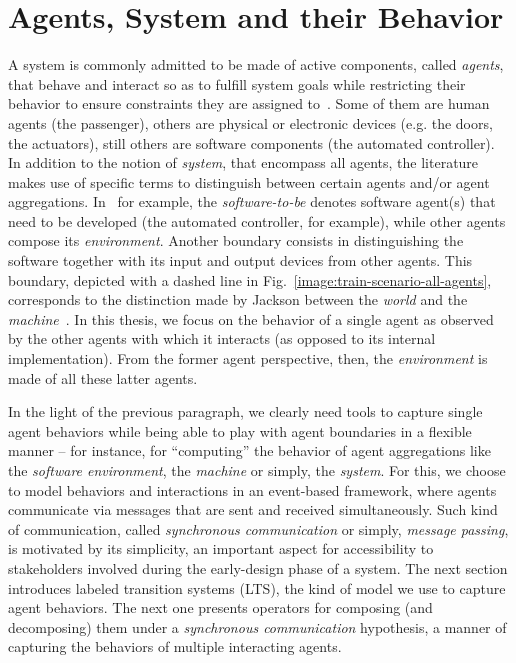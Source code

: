 \section{Agents, System and their Behavior}

A system is commonly admitted to be made of active components, called \emph{agents}, that behave and interact so as to fulfill system goals while restricting their behavior to ensure constraints they are assigned to~\cite{Feather:1987}. Some of them are human agents (the passenger), others are physical or electronic devices (e.g. the doors, the actuators), still others are software components (the automated controller). In addition to the notion of \emph{system}, that encompass all agents, the literature makes use of specific terms to distinguish between certain agents and/or agent aggregations. In~\cite{VanLamsweerde:2009} for example, the \emph{software-to-be} denotes software agent(s) that need to be developed (the automated controller, for example), while other agents compose its \emph{environment}. Another boundary consists in distinguishing the software together with its input and output devices from other agents. This boundary, depicted with a dashed line in Fig.~\ref{image:train-scenario-all-agents}, corresponds to the distinction made by Jackson between the \emph{world} and the \emph{machine}~\cite{Jackson:1995}. In this thesis, we focus on the behavior of a single agent as observed by the other agents with which it interacts (as opposed to its internal implementation). From the former agent perspective, then, the \emph{environment} is made of all these latter agents. 

In the light of the previous paragraph, we clearly need tools to capture single agent behaviors while being able to play with agent boundaries in a flexible manner -- for instance, for ``computing'' the behavior of agent aggregations like the \emph{software environment}, the \emph{machine} or simply, the \emph{system}. For this, we choose to model behaviors and interactions in an event-based framework, where agents communicate via messages that are sent and received simultaneously. Such kind of communication, called \emph{synchronous communication} or simply, \emph{message passing}, is motivated by its simplicity, an important aspect for accessibility to stakeholders involved during the early-design phase of a system. The next section introduces  labeled transition systems (LTS), the kind of model we use to capture agent behaviors. The next one presents operators for composing (and decomposing) them under a \emph{synchronous communication} hypothesis, a manner of capturing the behaviors of multiple interacting agents.

